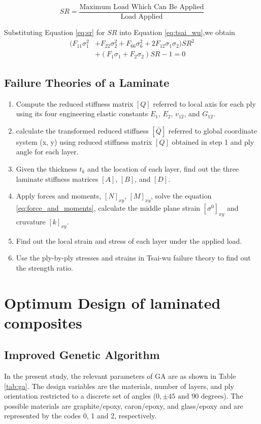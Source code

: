 \documentclass[Afour,sageh,times]{sagej}
\begin{document}
\begin{equation} \label{eq:sr}
	S R=\frac{\text {Maximum Load Which Can Be Applied}}{\text {Load Applied}}
\end{equation}


Substituting Equation \ref{eq:sr} for $SR$ into Equation \ref{eq:tsai_wu},we obtain
\begin{equation}
	\begin{split}
    	(F_{11}\sigma_1^2 & +F_{22}\sigma_2^2+F_{66}\sigma_6^2+2F_{12}\sigma_1\sigma_2)SR^2 \\ 
						  & +(F_1\sigma_1+F_2\sigma_2)SR-1=0
	 \end{split}
\end{equation}


\subsection{Failure Theories of a Laminate}

\begin{enumerate}
	\item Compute the reduced stiffness matrix $[Q]$ referred to local axis for each ply using its
		four engineering elastic constants $E_1$, $E_2$, $v_{12}$, and $G_{12}$.
	\item calculate the transformed reduced stiffness $[\bar{Q}]$ referred to global coordinate
		system (x, y) using reduced stiffness matrix $[Q]$ obtained in step 1 and ply angle for each layer.
	\item Given the thickness $t_k$ and the location of each layer, find out the three laminate
		stiffness matrices $[A]$, $[B]$, and $[D]$.
	\item Apply forces and moments, $[N]_{xy}$, $[M]_{xy}$, solve the equation
		\ref{eq:force_and_moments}, calculate the middle plane strain $[\sigma^0]_{xy}$ and
		cruvature $[k]_{xy}$.
	\item Find out the local strain and stress of each layer under the applied load.
	\item Use the ply-by-ply stresses and strains in Tsai-wu failure theory to find out the strength
		ratio.
\end{enumerate}

\section {Optimum Design of laminated composites}
\subsection{Improved Genetic Algorithm}
In the present study, the relevant parameters of GA are as shown in Table \ref{tab:ga}. The design
variables are the materials, number of layers, and ply orientation restricted to a discrete set of
angles ($0,\pm 45 \text{ and } 90 \text{ degrees} $). The possible materials are graphite/epoxy,
caron/epoxy, and glass/epoxy and are represented by the codes 0, 1 and 2, respectively.
\end{document}
